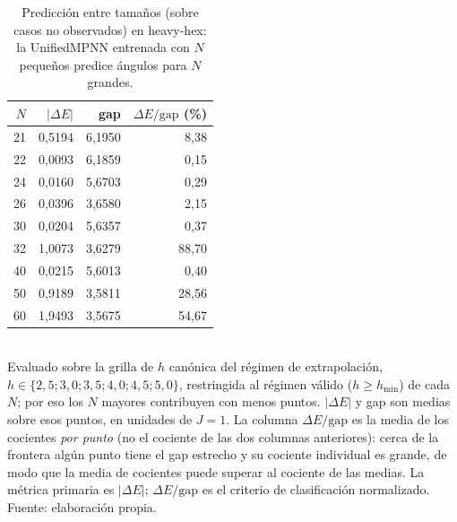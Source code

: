 \begin{table}[htbp]
\centering
\caption[Predicción a $N$ grande (heavy-hex)]{Predicción entre tamaños (sobre casos no observados) en heavy-hex: la UnifiedMPNN entrenada con $N$ pequeños predice ángulos para $N$ grandes.}
\label{tab:auto_heavy_hex_large_n}
\begin{tabular}{rrrr}
\toprule
$N$ & $|\Delta E|$ & gap & $\Delta E/\mathrm{gap}$ (\%) \\
\midrule
21 & 0,5194 & 6,1950 & 8,38 \\
22 & 0,0093 & 6,1859 & 0,15 \\
24 & 0,0160 & 5,6703 & 0,29 \\
26 & 0,0396 & 3,6580 & 2,15 \\
30 & 0,0204 & 5,6357 & 0,37 \\
32 & 1,0073 & 3,6279 & 88,70 \\
40 & 0,0215 & 5,6013 & 0,40 \\
50 & 0,9189 & 3,5811 & 28,56 \\
60 & 1,9493 & 3,5675 & 54,67 \\
\bottomrule
\end{tabular}
\\[2pt]
\footnotesize Evaluado sobre la grilla de $h$ canónica del régimen de extrapolación, $h \in \{2,5; 3,0; 3,5; 4,0; 4,5; 5,0\}$, restringida al régimen válido ($h \geq h_{\min}$) de cada $N$; por eso los $N$ mayores contribuyen con menos puntos. $|\Delta E|$ y gap son medias sobre esos puntos, en unidades de $J = 1$. La columna $\Delta E/\mathrm{gap}$ es la media de los cocientes \emph{por punto} (no el cociente de las dos columnas anteriores): cerca de la frontera algún punto tiene el gap estrecho y su cociente individual es grande, de modo que la media de cocientes puede superar al cociente de las medias. La métrica primaria es $|\Delta E|$; $\Delta E/\mathrm{gap}$ es el criterio de clasificación normalizado. Fuente: elaboración propia.
\end{table}
